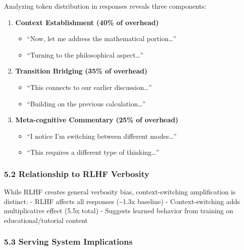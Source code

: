 \documentclass[
  11pt]{article}
\providecommand{\tightlist}{%
  \setlength{\itemsep}{0pt}\setlength{\parskip}{0pt}}
\begin{document}
Analyzing token distribution in responses reveals three components:

\begin{enumerate}
\def\labelenumi{\arabic{enumi}.}
\tightlist
\item
  \textbf{Context Establishment (40\% of overhead)}

  \begin{itemize}
  \tightlist
  \item
    ``Now, let me address the mathematical portion\ldots{}''
  \item
    ``Turning to the philosophical aspect\ldots{}''
  \end{itemize}
\item
  \textbf{Transition Bridging (35\% of overhead)}

  \begin{itemize}
  \tightlist
  \item
    ``This connects to our earlier discussion\ldots{}''
  \item
    ``Building on the previous calculation\ldots{}''
  \end{itemize}
\item
  \textbf{Meta-cognitive Commentary (25\% of overhead)}

  \begin{itemize}
  \tightlist
  \item
    ``I notice I'm switching between different modes\ldots{}''
  \item
    ``This requires a different type of thinking\ldots{}''
  \end{itemize}
\end{enumerate}

\subsubsection{5.2 Relationship to RLHF
Verbosity}\label{relationship-to-rlhf-verbosity}

While RLHF creates general verbosity bias, context-switching
amplification is distinct: - RLHF affects all responses
(\textasciitilde1.3x baseline) - Context-switching adds multiplicative
effect (5.5x total) - Suggests learned behavior from training on
educational/tutorial content

\subsubsection{5.3 Serving System
Implications}\label{serving-system-implications}
\end{document}

